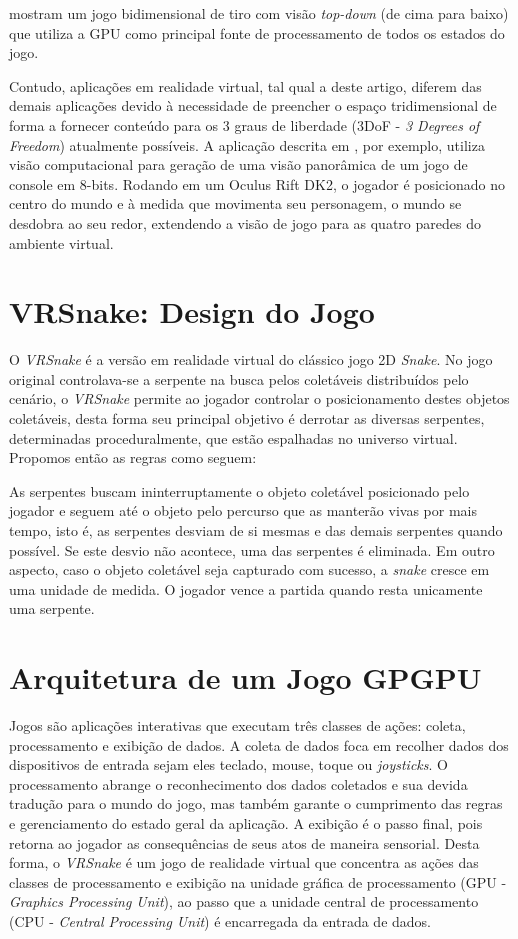 \documentclass[conference]{IEEEtran}
\begin{document}
\cite{GPGPUWars} mostram um jogo bidimensional de tiro com visão \textit{top-down} (de cima para baixo) que utiliza a GPU como principal fonte de processamento de todos os estados do jogo.

Contudo, aplicações em realidade virtual, tal qual a deste artigo, diferem das demais aplicações devido à necessidade de preencher o espaço tridimensional de forma a fornecer conteúdo para os 3 graus de liberdade (3DoF - \textit{3 Degrees of Freedom}) atualmente possíveis. A aplicação descrita em \cite{zund2015unfolding}, por exemplo, utiliza visão computacional para geração de uma visão panorâmica de um jogo de console em 8-bits. Rodando em um Oculus Rift DK2, o jogador é posicionado no centro do mundo e à medida que movimenta seu personagem, o mundo se desdobra ao seu redor, extendendo a visão de jogo para as quatro paredes do ambiente virtual.

\section{VRSnake: Design do Jogo} \label{sec:vrsnake}
O \textit{VRSnake} é a versão em realidade virtual do clássico jogo 2D \textit{Snake}. No jogo original controlava-se a serpente na busca pelos coletáveis distribuídos pelo cenário, o \textit{VRSnake} permite ao jogador controlar o posicionamento destes objetos coletáveis, desta forma seu principal objetivo é derrotar as diversas serpentes, determinadas proceduralmente, que estão espalhadas no universo virtual. Propomos então as regras como seguem:

As serpentes buscam ininterruptamente o objeto coletável posicionado pelo jogador e seguem até o objeto pelo percurso que as manterão vivas por mais tempo, isto é, as serpentes desviam de si mesmas e das demais serpentes quando possível. Se este desvio não acontece, uma das serpentes é eliminada. Em outro aspecto, caso o objeto coletável seja capturado com sucesso, a \textit{snake} cresce em uma unidade de medida. O jogador vence a partida quando resta unicamente uma serpente.

\section{Arquitetura de um Jogo GPGPU}
Jogos são aplicações interativas que executam três classes de ações: coleta, processamento e exibição de dados. %
A coleta de dados foca em recolher dados dos dispositivos de entrada sejam eles teclado, mouse, toque ou \textit{joysticks}. O processamento abrange o reconhecimento dos dados coletados e sua devida tradução para o mundo do jogo, mas também garante o cumprimento das regras e gerenciamento do estado geral da aplicação. A exibição é o passo final, pois retorna ao jogador as consequências de seus atos de maneira sensorial. Desta forma, o \textit{VRSnake} é um jogo de realidade virtual que concentra as ações das classes de processamento e exibição na unidade gráfica de processamento (GPU - \textit{Graphics Processing Unit}), ao passo que a unidade central de processamento (CPU - \textit{Central Processing Unit}) é encarregada da entrada de dados.
\end{document}
